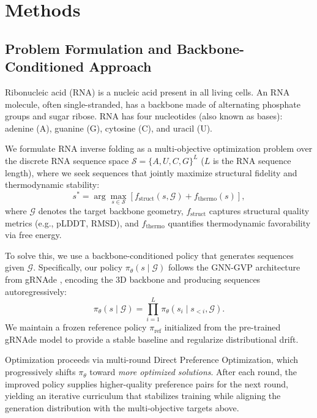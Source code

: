 \section{Methods}
\label{sec:method}

\subsection{Problem Formulation and Backbone-Conditioned Approach}
Ribonucleic acid (RNA) is a nucleic acid present in all living cells. An RNA molecule, often single-stranded, has a backbone made of alternating phosphate groups and sugar ribose. RNA has four nucleotides (also known as bases): adenine (A), guanine (G), cytosine (C), and uracil (U).

We formulate RNA inverse folding as a multi-objective optimization problem over the discrete RNA sequence space $\mathcal{S}=\{A,U,C,G\}^L$ ($L$ is the RNA sequence length), where we seek sequences that jointly maximize structural fidelity and thermodynamic stability:
\begin{equation}
s^*=\arg\max_{s\in\mathcal{S}}\left[f_{\text{struct}}(s,\mathcal{G})+f_{\text{thermo}}(s)\right],
\end{equation}
where $\mathcal{G}$ denotes the target backbone geometry, $f_{\text{struct}}$ captures structural quality metrics (e.g., pLDDT, RMSD), and $f_{\text{thermo}}$ quantifies thermodynamic favorability via free energy.

To solve this, we use a backbone-conditioned policy that generates sequences given $\mathcal{G}$. Specifically, our policy $\pi_\theta(s\mid\mathcal{G})$ follows the GNN-GVP architecture from gRNAde \citep{joshi2025grnade}, encoding the 3D backbone and producing sequences autoregressively:
\begin{equation}
\pi_\theta(s\mid\mathcal{G})=\prod_{i=1}^L \pi_\theta(s_i \mid s_{<i}, \mathcal{G}).
\end{equation}
We maintain a frozen reference policy $\pi_{\mathrm{ref}}$ initialized from the pre-trained gRNAde model to provide a stable baseline and regularize distributional drift.

Optimization proceeds via multi-round Direct Preference Optimization, which progressively shifts $\pi_\theta$ toward \emph{more optimized solutions}. After each round, the improved policy supplies higher-quality preference pairs for the next round, yielding an iterative curriculum that stabilizes training while aligning the generation distribution with the multi-objective targets above.


